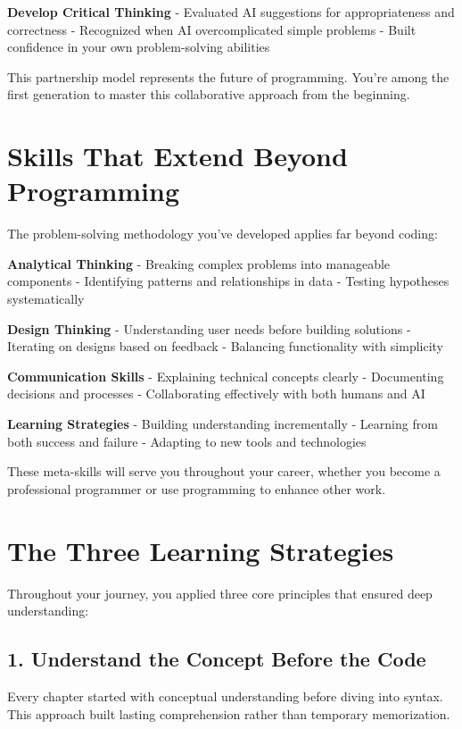 \documentclass[
  letterpaper,
  DIV=11,
  numbers=noendperiod,
  oneside]{scrreprt}
\begin{document}
\textbf{Develop Critical Thinking} - Evaluated AI suggestions for
appropriateness and correctness - Recognized when AI overcomplicated
simple problems - Built confidence in your own problem-solving abilities

This partnership model represents the future of programming. You're
among the first generation to master this collaborative approach from
the beginning.

\section{Skills That Extend Beyond
Programming}\label{skills-that-extend-beyond-programming}

The problem-solving methodology you've developed applies far beyond
coding:

\textbf{Analytical Thinking} - Breaking complex problems into manageable
components - Identifying patterns and relationships in data - Testing
hypotheses systematically

\textbf{Design Thinking} - Understanding user needs before building
solutions - Iterating on designs based on feedback - Balancing
functionality with simplicity

\textbf{Communication Skills} - Explaining technical concepts clearly -
Documenting decisions and processes - Collaborating effectively with
both humans and AI

\textbf{Learning Strategies} - Building understanding incrementally -
Learning from both success and failure - Adapting to new tools and
technologies

These meta-skills will serve you throughout your career, whether you
become a professional programmer or use programming to enhance other
work.

\section{The Three Learning
Strategies}\label{the-three-learning-strategies-1}

Throughout your journey, you applied three core principles that ensured
deep understanding:

\subsection{1. Understand the Concept Before the
Code}\label{understand-the-concept-before-the-code}

Every chapter started with conceptual understanding before diving into
syntax. This approach built lasting comprehension rather than temporary
memorization.
\end{document}
